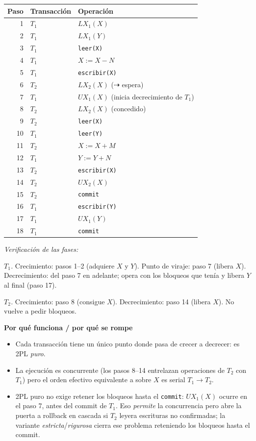 \documentclass[11pt,a4paper]{article}
\newcommand{\itemcabecera}[1]{\noindent\textbf{#1}\par\medskip}
\newcommand{\bloquePorque}{\itemcabecera{Por qu\'e funciona / por qu\'e se rompe}}
\begin{document}
\begin{center}
\begin{tabular}{rll}
\toprule
Paso & Transacción & Operación \\
\midrule
1  & $T_1$ & $LX_1(X)$ \\
2  & $T_1$ & $LX_1(Y)$ \\
3  & $T_1$ & \texttt{leer(X)} \\
4  & $T_1$ & $X := X - N$ \\
5  & $T_1$ & \texttt{escribir(X)} \\
6  & $T_2$ & $LX_2(X)$ ($\dashrightarrow$ espera) \\
7  & $T_1$ & $UX_1(X)$ (inicia decrecimiento de $T_1$) \\
8  & $T_2$ & $LX_2(X)$ (concedido) \\
9  & $T_2$ & \texttt{leer(X)} \\
10 & $T_1$ & \texttt{leer(Y)} \\
11 & $T_2$ & $X := X + M$ \\
12 & $T_1$ & $Y := Y + N$ \\
13 & $T_2$ & \texttt{escribir(X)} \\
14 & $T_2$ & $UX_2(X)$ \\
15 & $T_2$ & \texttt{commit} \\
16 & $T_1$ & \texttt{escribir(Y)} \\
17 & $T_1$ & $UX_1(Y)$ \\
18 & $T_1$ & \texttt{commit} \\
\bottomrule
\end{tabular}
\end{center}

\textit{Verificación de las fases:}

\textit{$T_1$.} Crecimiento: pasos 1--2 (adquiere $X$ y $Y$). Punto de viraje: paso 7 (libera $X$). Decrecimiento: del paso 7 en adelante; opera con los bloqueos que tenía y libera $Y$ al final (paso 17).

\textit{$T_2$.} Crecimiento: paso 8 (consigue $X$). Decrecimiento: paso 14 (libera $X$). No vuelve a pedir bloqueos.

\bloquePorque

\begin{itemize}
    \item Cada transacción tiene un único punto donde pasa de crecer a decrecer: es 2PL \emph{puro}.
    \item La ejecución es concurrente (los pasos 8--14 entrelazan operaciones de $T_2$ con $T_1$) pero el orden efectivo equivalente a sobre $X$ es serial $T_1 \rightarrow T_2$.
    \item 2PL puro no exige retener los bloqueos hasta el \texttt{commit}: $UX_1(X)$ ocurre en el paso 7, antes del commit de $T_1$. Eso \emph{permite} la concurrencia pero abre la puerta a rollback en cascada si $T_2$ leyera escrituras no confirmadas; la variante \emph{estricta}/\emph{rigurosa} cierra ese problema reteniendo los bloqueos hasta el commit.
\end{itemize}
\end{document}
